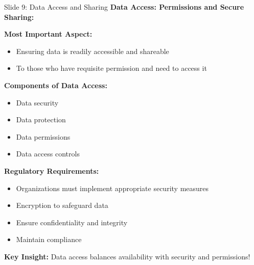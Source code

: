\documentclass[8pt]{beamer}
\begin{document}
	\begin{frame}{Slide 9: Data Access and Sharing}
		\fontsize{6.5}{7.5}\selectfont
		\textbf{Data Access: Permissions and Secure Sharing:}
		
		\vspace{0.1cm}
		\textbf{Most Important Aspect:}
		\begin{itemize}
			\item Ensuring data is readily accessible and shareable
			\item To those who have requisite permission and need to access it
		\end{itemize}
		
		\vspace{0.1cm}
		\textbf{Components of Data Access:}
		\begin{itemize}
			\item Data security
			\item Data protection
			\item Data permissions
			\item Data access controls
		\end{itemize}
		
		\vspace{0.1cm}
		\textbf{Regulatory Requirements:}
		\begin{itemize}
			\item Organizations must implement appropriate security measures
			\item Encryption to safeguard data
			\item Ensure confidentiality and integrity
			\item Maintain compliance
		\end{itemize}
		
		\textcolor{myblue}{\textbf{Key Insight:}} Data access balances \textcolor{myblue}{availability with security and permissions}!
	\end{frame}
	
\end{document}
